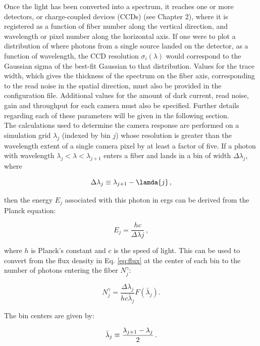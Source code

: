 Once the light has been converted into a spectrum, it reaches one or more detectors, or charge-coupled devices (CCDs) (see Chapter 2), where it is registered as a function of fiber number along the vertical direction, and wavelength or pixel number along the horizontal axis. If one were to plot a distribution of where photons from a single source landed on the detector, as a function of wavelength, the CCD resolution $\sigma_{i}(\lambda)$ would correspond to the Gaussian sigma of the best-fit Gaussian to that distribution. Values for the trace width, which gives the thickness of the spectrum on the fiber axis, corresponding to the read noise in the spatial direction, must also be provided in the configuration file. Additional values for the amount of dark current, read noise, gain and throughput for each camera must also be specified. Further details regarding each of these parameters will be given in the following section.\\

The calculations used to determine the camera response are performed on a simulation grid $\lambda_{j}$ (indexed by bin $j$) whose resolution is greater than the wavelength extent of a single camera pixel by at least a factor of five. If a photon with wavelength $\lambda_{j} < \lambda < \lambda_{j+1}$ enters a fiber and lands in a bin of width $\Delta \lambda_{j}$, where

\begin{equation}
    \Delta \lambda_{j} \equiv \lambda_{j+1} - \lamda{j}\,,
\end{equation}

then the energy $E_{j}$ associated with this photon in ergs can be derived from the Planck equation:

\begin{equation}
    E_{j} = \frac{hc}{\Delta \lambda{j}}\,,
\end{equation}

where $h$ is Planck's constant and $c$ is the speed of light. This can be used to convert from the flux density in Eq. \ref{eq:flux} at the center of each bin to the number of photons entering the fiber $N_{j}^{\gamma}$:

\begin{equation}
    N_{j}^{\gamma} = \frac{\Delta \lambda_{j}}{hc\bar{\lambda}_{j}}F(\bar{\lambda}_{j}).
\end{equation} 

The bin centers are given by:

\begin{equation}
    \bar{\lambda}_{j} \equiv \frac{\lambda_{j+1} - \lambda_{j}}{2}\,.\\
\end{equation}


